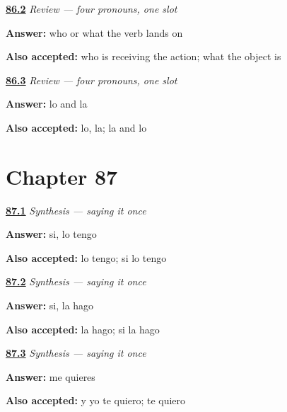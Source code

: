 \noindent\begin{minipage}[t]{\linewidth}
\raggedright
\hyperlink{review-ES-C42-repaso-objeto-question}{\textbf{86.2}} \emph{Review — four pronouns, one slot}\par
\small \textbf{Answer:} who or what the verb lands on\par
\footnotesize \textbf{Also accepted:} who is receiving the action; what the object is
\end{minipage}\par\medskip

\noindent\begin{minipage}[t]{\linewidth}
\raggedright
\hyperlink{review-ES-C42-repaso-objeto-hard}{\textbf{86.3}} \emph{Review — four pronouns, one slot}\par
\small \textbf{Answer:} lo and la\par
\footnotesize \textbf{Also accepted:} lo, la; la and lo
\end{minipage}\par\medskip

\section*{Chapter 87}

\noindent\begin{minipage}[t]{\linewidth}
\raggedright
\hyperlink{review-ES-C42-sintesis-decirlo-una-vez-book}{\textbf{87.1}} \emph{Synthesis — saying it once}\par
\small \textbf{Answer:} si, lo tengo\par
\footnotesize \textbf{Also accepted:} lo tengo; si lo tengo
\end{minipage}\par\medskip

\noindent\begin{minipage}[t]{\linewidth}
\raggedright
\hyperlink{review-ES-C42-sintesis-decirlo-una-vez-meal}{\textbf{87.2}} \emph{Synthesis — saying it once}\par
\small \textbf{Answer:} si, la hago\par
\footnotesize \textbf{Also accepted:} la hago; si la hago
\end{minipage}\par\medskip

\noindent\begin{minipage}[t]{\linewidth}
\raggedright
\hyperlink{review-ES-C42-sintesis-decirlo-una-vez-people}{\textbf{87.3}} \emph{Synthesis — saying it once}\par
\small \textbf{Answer:} me quieres\par
\footnotesize \textbf{Also accepted:} y yo te quiero; te quiero
\end{minipage}\par\medskip


